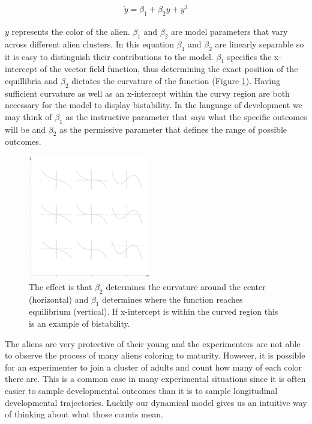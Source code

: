 \documentclass[letterpaper]{article}
\begin{document}
\begin{eqnarray}
    \dot{y} = \beta_1 + \beta_2 y + y^3
\end{eqnarray}

$y$ represents the color of the alien. $\beta_1$ and $\beta_2$ are model 
parameters that vary across different alien clusters. In this equation $\beta_1$ and
$\beta_2$ are linearly separable so it is easy to distinguish their contributions 
to the model. $\beta_1$ specifies the x-intercept of the vector field function,
thus determining the exact position of the equillibria and $\beta_2$ dictates the 
curvature of the function (Figure \ref{cubic_params}). 
Having sufficient curvature as well as an x-intercept
within the curvy region are both necessary for the model to display bistability.
In the language of development we may think of $\beta_1$ as the instructive parameter 
that says what the
specific outcomes will be and $\beta_2$ as the permissive parameter that defines the
range of possible outcomes.

\begin{figure}[t]
\begin{center}
\includegraphics[width=2.1in,angle=0]{./cubic_params.png}
\caption{The effect is that $\beta_2$ determines the curvature around the 
center (horizontal)
and $\beta_1$ determines where the function reaches equilibrium (vertical).
If x-intercept is within the curved region this is an example of bistability.}
\label{cubic_params}
\end{center}
\end{figure}

The aliens are very protective of their young and the experimenters are not able
to observe the process of many aliens coloring to maturity. However,
it is possible for an experimenter to join a cluster of adults and count
how many of each color there are. This is a common case in many experimental 
situations since it is often
easier to sample developmental outcomes than it is to sample longitudinal developmental
trajectories. Luckily our dynamical model gives us an intuitive way of thinking about
what those counts mean. 
\end{document}
